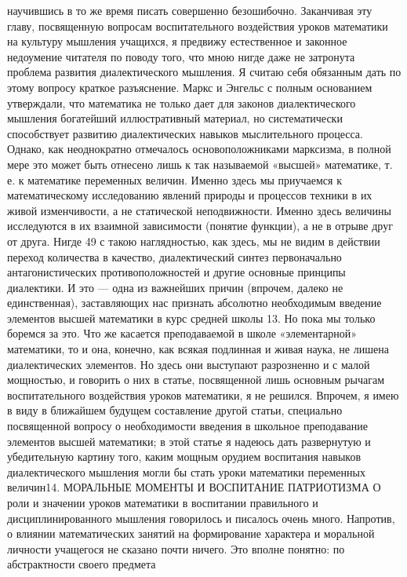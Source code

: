 \documentclass[12pt, a4paper, openany]{book}
\begin{document}
научившись в то же время писать совершенно безошибочно. 
Заканчивая эту главу, посвященную вопросам  
воспитательного воздействия уроков математики на культуру 
мышления учащихся, я предвижу естественное и законное 
недоумение читателя по поводу того, что мною нигде даже 
не затронута проблема развития диалектического  
мышления. Я считаю себя обязанным дать по этому вопросу 
краткое разъяснение. 
Маркс и Энгельс с полным основанием утверждали, 
что математика не только дает для законов  
диалектического мышления богатейший иллюстративный материал, 
но систематически способствует развитию диалектических 
навыков мыслительного процесса. Однако, как  
неоднократно отмечалось основоположниками марксизма, в полной 
мере это может быть отнесено лишь к так называемой  
«высшей» математике, т. е. к математике переменных величин. 
Именно здесь мы приучаемся к математическому  
исследованию явлений природы и процессов техники в их  
живой изменчивости, а не статической неподвижности.  
Именно здесь величины исследуются в их взаимной  
зависимости (понятие функции), а не в отрыве друг от друга. Нигде 
49 
с такою наглядностью, как здесь, мы не видим в действии 
переход количества в качество, диалектический синтез 
первоначально антагонистических противоположностей и 
другие основные принципы диалектики. И это — одна из 
важнейших причин (впрочем, далеко не единственная), 
заставляющих нас признать абсолютно необходимым  
введение элементов высшей математики в курс средней  
школы 13. 
Но пока мы только боремся за это. Что же касается 
преподаваемой в школе «элементарной» математики, то 
и она, конечно, как всякая подлинная и живая наука, 
не лишена диалектических элементов. Но здесь они  
выступают разрозненно и с малой мощностью, и говорить о них 
в статье, посвященной лишь основным рычагам  
воспитательного воздействия уроков математики, я не решился. 
Впрочем, я имею в виду в ближайшем будущем составление 
другой статьи, специально посвященной вопросу о  
необходимости введения в школьное преподавание элементов 
высшей математики; в этой статье я надеюсь дать  
развернутую и убедительную картину того, каким мощным  
орудием воспитания навыков диалектического мышления  
могли бы стать уроки математики переменных величин14. 
МОРАЛЬНЫЕ МОМЕНТЫ 
И ВОСПИТАНИЕ ПАТРИОТИЗМА 
О роли и значении уроков математики в воспитании  
правильного и дисциплинированного мышления говорилось 
и писалось очень много. Напротив, о влиянии  
математических занятий на формирование характера и моральной 
личности учащегося не сказано почти ничего. Это вполне 
понятно: по абстрактности своего предмета  
\end{document}
